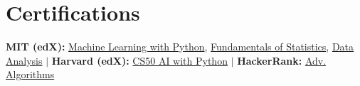 \documentclass[10pt, letterpaper]{article}
\begin{document}
\section{Certifications}
  \small{
    \textbf{MIT (edX):} \href{https://courses.edx.org/certificates/bf4ea7cb34a742cea00c770801d1947d}{Machine Learning with Python}, \href{https://courses.edx.org/certificates/3c59035943454549990f2d2de7f49e9f}{Fundamentals of Statistics}, \href{https://courses.edx.org/certificates/bf4ea7cb34a742cea00c770801d1947d}{Data Analysis} $|$
    \textbf{Harvard (edX):} \href{https://cs50.harvard.edu/certificates/2b1773c1-473d-4a7b-89ae-460d23154126}{CS50 AI with Python} $|$
    \textbf{HackerRank:} \href{https://www.hackerrank.com/certificates/fc7b9af8aac8}{Adv. Algorithms}
  }
\end{document}
